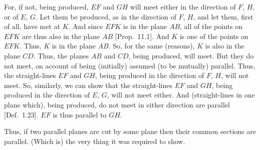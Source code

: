 \begin{Parallel}{}{}
{For, if not, being produced, $EF$ and $GH$ will  meet either in the direction of $F$, $H$, 
 or of $E$, $G$. Let them  be produced, as  in the  direction of $F$, $H$, and let them, first of all, have met at $K$. And since $EFK$ is in the plane $AB$, all
 of the points on $EFK$ are thus also in the plane $AB$ [Prop.~11.1]. And $K$ is one of the points on $EFK$. Thus, $K$ is in the
 plane $AB$. So, for the same (reasons), $K$ is also in the plane $CD$. 
 Thus, the planes $AB$ and $CD$, being produced, will meet. But they do
 not meet, on account of being (initially) assumed (to be mutually) parallel. Thus,
 the straight-lines $EF$ and $GH$, being produced in the
direction of $F$, $H$, will not meet. So, similarly, we can show that the straight-lines
 $EF$ and $GH$, being produced in the direction of $E$, $G$, will not meet
 either. And (straight-lines in one plane which), being produced,  do not meet in either direction
 are parallel [Def.~1.23]. $EF$ is thus parallel to $GH$.

\centerline{}
 
 Thus, if two parallel planes are cut by some plane
then their common sections are parallel. (Which is) the very thing it was
required to show.}
\end{Parallel}

